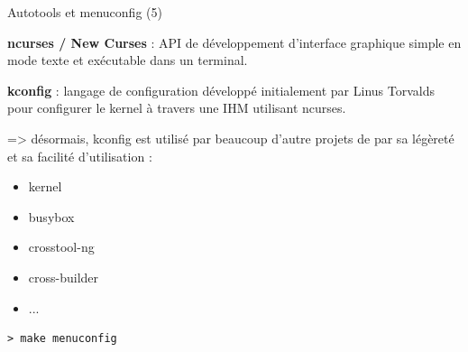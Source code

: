 \documentclass[12pt, t]{beamer}
\newcommand{\bi}{\begin{itemize}}
\newcommand{\ei}{\end{itemize}}
\begin{document}
\begin{frame}{Autotools et menuconfig (5)}

    \vspace{10pt}
    {\textbf{ncurses / New Curses}} : API de développement d'interface graphique
    simple en mode texte et exécutable dans un terminal.

    {
        \vspace{10pt}
        {\textbf{kconfig}} : langage de configuration développé initialement par
        Linus Torvalds pour configurer le kernel à travers une IHM utilisant
        ncurses.
    }

    {
        \vspace{10pt}
        => désormais, kconfig est utilisé par beaucoup d'autre projets de par sa
        légèreté et sa facilité d'utilisation :

        \bi
        \item kernel
        \item busybox
        \item crosstool-ng
        \item cross-builder
        \item ...
        \ei
    }
\end{frame}

{
    \begin{lstlisting}
> make menuconfig
    \end{lstlisting}
}
\end{document}
